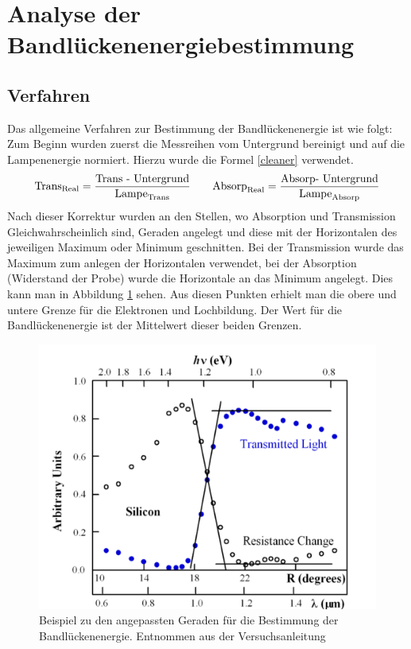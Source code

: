 \section{Analyse der Bandlückenenergiebestimmung}
\subsection{Verfahren}
Das allgemeine Verfahren zur Bestimmung der Bandlückenenergie ist wie folgt:
Zum Beginn wurden zuerst die Messreihen vom Untergrund bereinigt und auf die Lampenenergie normiert. Hierzu wurde die Formel \ref{cleaner} verwendet. 
\begin{equation}
\label{cleaner}
\text{Trans}_{\text{Real}} = \frac{\text{\text{Trans }- \text{Untergrund}}}{\text{Lampe}_{\text{Trans}}} \qquad 
\text{Absorp}_{\text{Real}} = \frac{\text{\text{Absorp}- \text{Untergrund}}}{\text{Lampe}_{\text{Absorp}}}
\end{equation}
Nach dieser Korrektur wurden an den Stellen, wo Absorption und Transmission Gleichwahrscheinlich sind, Geraden angelegt und diese mit der Horizontalen des jeweiligen Maximum oder Minimum geschnitten. Bei der Transmission wurde das Maximum zum anlegen der Horizontalen verwendet, bei der Absorption (Widerstand der Probe) wurde die Horizontale an das Minimum angelegt. Dies kann man in Abbildung \ref{anleitung_fit} sehen. Aus diesen Punkten erhielt man die obere und untere Grenze für die Elektronen und Lochbildung. Der Wert für die Bandlückenenergie ist der Mittelwert dieser beiden Grenzen.
\begin{figure}[h]
	\centering
	\label{anleitung_fit}
	\includegraphics[scale=0.7]{Bilder/bsp_fit}
	\caption[Referenz zur Geraden Anpassung]{\small Beispiel zu den angepassten Geraden für die Bestimmung der Bandlückenenergie. Entnommen aus der Versuchsanleitung \cite{anleitung}}
\end{figure}

